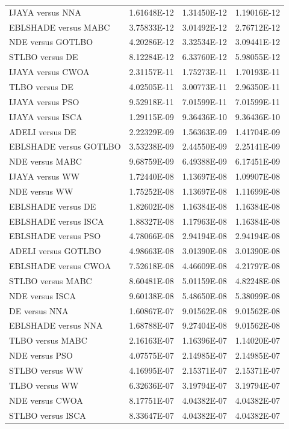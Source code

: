 \documentclass[a4paper,fleqn]{cas-dc}
\begin{document}
\begin{table}[<options>]
\begin{tabular*}{\tblwidth}{@{}LCCC@{}}
IJAYA versus NNA&1.61648E-12&1.31450E-12&1.19016E-12\\
EBLSHADE versus MABC&3.75833E-12&3.01492E-12&2.76712E-12\\
NDE versus GOTLBO&4.20286E-12&3.32534E-12&3.09441E-12\\
STLBO versus DE&8.12284E-12&6.33760E-12&5.98055E-12\\
IJAYA versus CWOA&2.31157E-11&1.75273E-11&1.70193E-11\\
TLBO versus DE&4.02505E-11&3.00773E-11&2.96350E-11\\
IJAYA versus PSO&9.52918E-11&7.01599E-11&7.01599E-11\\
IJAYA versus ISCA&1.29115E-09&9.36436E-10&9.36436E-10\\
ADELI versus DE&2.22329E-09&1.56363E-09&1.41704E-09\\
EBLSHADE versus GOTLBO&3.53238E-09&2.44550E-09&2.25141E-09\\
NDE versus MABC&9.68759E-09&6.49388E-09&6.17451E-09\\
IJAYA versus WW&1.72440E-08&1.13697E-08&1.09907E-08\\
NDE versus WW&1.75252E-08&1.13697E-08&1.11699E-08\\
EBLSHADE versus DE&1.82602E-08&1.16384E-08&1.16384E-08\\
EBLSHADE versus ISCA&1.88327E-08&1.17963E-08&1.16384E-08\\
EBLSHADE versus PSO&4.78066E-08&2.94194E-08&2.94194E-08\\
ADELI versus GOTLBO&4.98663E-08&3.01390E-08&3.01390E-08\\
EBLSHADE versus CWOA&7.52618E-08&4.46609E-08&4.21797E-08\\
STLBO versus MABC&8.60481E-08&5.01159E-08&4.82248E-08\\
NDE versus ISCA&9.60138E-08&5.48650E-08&5.38099E-08\\
DE versus NNA&1.60867E-07&9.01562E-08&9.01562E-08\\
EBLSHADE versus NNA&1.68788E-07&9.27404E-08&9.01562E-08\\
TLBO versus MABC&2.16163E-07&1.16396E-07&1.14020E-07\\
NDE versus PSO&4.07575E-07&2.14985E-07&2.14985E-07\\
STLBO versus WW&4.16995E-07&2.15371E-07&2.15371E-07\\
TLBO versus WW&6.32636E-07&3.19794E-07&3.19794E-07\\
NDE versus CWOA&8.17751E-07&4.04382E-07&4.04382E-07\\
STLBO versus ISCA&8.33647E-07&4.04382E-07&4.04382E-07\\

\end{tabular*}
\end{table}
\end{document}
